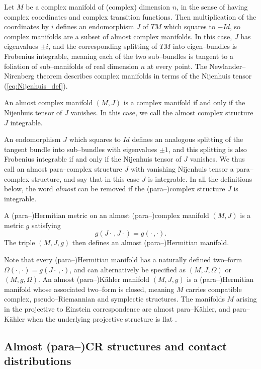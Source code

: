 Let $M$ be a complex manifold of (complex) dimension $n$, in the sense of having complex coordinates and complex transition functions. Then multiplication of the coordinates by $i$ defines an endomorphism $J$ of $TM$ which squares to $-Id$, so complex manifolds are a subset of almost complex manifolds. In this case, $J$ has eigenvalues $\pm i$, and the corresponding splitting of $TM$ into eigen--bundles is Frobenius integrable, meaning each of the two sub--bundles is tangent to a foliation of sub--manifolds of real dimension $n$ at every point. The Newlander--Nirenberg theorem describes complex manifolds in terms of the Nijenhuis tensor (\ref{eq:Nijenhuis_def}).

\begin{theo}[\cite{CG}]
An almost complex manifold $(M,J)$ is a complex manifold if and only if the Nijenhuis tensor of $J$ vanishes. In this case, we call the almost complex structure $J$ integrable.
\end{theo}


An endomorphism $J$ which squares to $Id$ defines an analogous splitting of the tangent bundle into sub--bundles with eigenvalues $\pm 1$, and this splitting is also Frobenius integrable if and only if the Nijenhuis tensor of $J$ vanishes. We thus call an almost para--complex structure $J$ with vanishing Nijenhuis tensor a para--complex structure, and say that in this case $J$ is integrable. In all the definitions below, the word \textit{almost} can be removed if the (para--)complex structure $J$ is integrable.

\begin{defi}
A (para--)Hermitian metric on an almost (para--)complex manifold $(M,J)$ is a metric $g$ satisfying
\[
g(J\cdot\,,J\cdot) = g(\cdot\,,\cdot).
\]
The triple $(M,J,g)$ then defines an almost (para--)Hermitian manifold.
\end{defi}

Note that every (para--)Hermitian manifold has a naturally defined two--form $\Omega(\cdot\,,\cdot)=g(J\cdot\,,\cdot)$, and can alternatively be specified as $(M,J,\Omega)$ or $(M,g,\Omega)$. An almost (para--)K\"ahler manifold $(M,J,g)$ is a (para--)Hermitian manifold whose associated two--form is closed, meaning $M$ carries compatible complex, pseudo--Riemannian and symplectic structures. The manifolds $M$ arising in the projective to Einstein correspondence are almost para--K\"ahler, and para--K\"ahler when the underlying projective structure is flat \cite{DM}.

\subsection{Almost (para--)CR structures and contact distributions}

